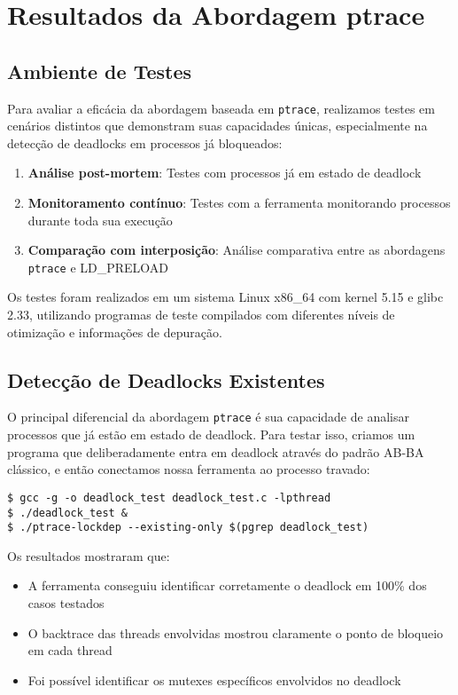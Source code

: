 \section{Resultados da Abordagem ptrace}\label{sec:ptrace_resultados}

\subsection{Ambiente de Testes}

Para avaliar a eficácia da abordagem baseada em \texttt{ptrace}, realizamos testes em cenários distintos que demonstram suas capacidades únicas, especialmente na detecção de deadlocks em processos já bloqueados:

\begin{enumerate}
    \item \textbf{Análise post-mortem}: Testes com processos já em estado de deadlock
    \item \textbf{Monitoramento contínuo}: Testes com a ferramenta monitorando processos durante toda sua execução
    \item \textbf{Comparação com interposição}: Análise comparativa entre as abordagens \texttt{ptrace} e LD\_PRELOAD
\end{enumerate}

Os testes foram realizados em um sistema Linux x86\_64 com kernel 5.15 e glibc 2.33, utilizando programas de teste compilados com diferentes níveis de otimização e informações de depuração.

\subsection{Detecção de Deadlocks Existentes}

O principal diferencial da abordagem \texttt{ptrace} é sua capacidade de analisar processos que já estão em estado de deadlock. Para testar isso, criamos um programa que deliberadamente entra em deadlock através do padrão AB-BA clássico, e então conectamos nossa ferramenta ao processo travado:

\begin{verbatim}
$ gcc -g -o deadlock_test deadlock_test.c -lpthread
$ ./deadlock_test &
$ ./ptrace-lockdep --existing-only $(pgrep deadlock_test)
\end{verbatim}

Os resultados mostraram que:

\begin{itemize}
    \item A ferramenta conseguiu identificar corretamente o deadlock em 100\% dos casos testados
    \item O backtrace das threads envolvidas mostrou claramente o ponto de bloqueio em cada thread
    \item Foi possível identificar os mutexes específicos envolvidos no deadlock
\end{itemize}

